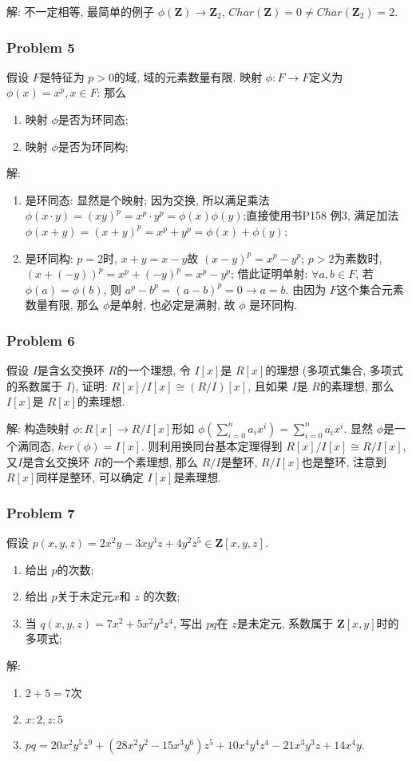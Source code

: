 \documentclass[a4paper,12pt]{ctexart}
\newcommand{\Z}{\mathbf{Z}}
\begin{document}
    解: 不一定相等, 最简单的例子 $ \phi(\Z)\rightarrow\Z_2 $, $ Char(\Z)=0\neq Char(\Z_2)=2 $.
    \subsubsection*{Problem 5}
    假设 $ F $是特征为 $ p>0 $的域, 域的元素数量有限. 映射 $ \phi:F\rightarrow F $定义为 $ \phi(x)=x^p,x\in F $:
    那么\begin{enumerate}
      \item 映射 $ \phi $是否为环同态;
      \item 映射 $ \phi $是否为环同构;
    \end{enumerate} 

    解:\begin{enumerate}
      \item 是环同态: 显然是个映射; 因为交换, 所以满足乘法 $ \phi(x\cdot y)=(xy)^p=x^p\cdot y^p=\phi(x)\phi(y) $;直接使用书P158 例3, 满足加法 $ \phi(x+y)=(x+y)^p=x^p+y^p=\phi(x)+\phi(y) $;
      \item 是环同构: $ p=2 $时, $ x+y=x-y $故 $ (x-y)^p=x^p-y^p $; $ p>2 $为素数时, $ (x+(-y))^p=x^p+(-y)^p=x^p-y^p $; 借此证明单射: $ \forall a,b\in F $, 若
      $ \phi(a)=\phi(b) $, 则 $ a^p-b^p=(a-b)^p=0\rightarrow a=b $. 由因为 $ F $这个集合元素数量有限, 那么 $ \phi $是单射, 也必定是满射, 故 $ \phi $ 是环同构.
    \end{enumerate}
\subsubsection*{Problem 6}
    假设 $ I $是含幺交换环 $ R $的一个理想, 令 $ I[x] $是 $ R[x] $的理想 (多项式集合, 多项式的系数属于 $ I $), 证明: $ R[x]/I[x]\cong (R/I)[x] $, 且如果
    $ I $是 $ R $的素理想, 那么 $ I[x] $是 $ R[x] $的素理想. 

    解: 构造映射 $ \phi:R[x]\rightarrow R/I[x] $形如 $ \phi(\sum_{i=0}^{n}a_ix^i)=\sum_{i=0}^{n}\overline{a_i}x^i $. 显然 $ \phi $是一个满同态, $ ker(\phi)=I[x] $.
    则利用换同台基本定理得到 $ R[x]/I[x]\cong R/I[x] $, 又$ I $是含幺交换环 $ R $的一个素理想, 那么 $ R/I $是整环, $ R/I[x] $也是整环, 注意到 $ R[x] $同样是整环, 可以确定 
    $ I[x] $是素理想.
\subsubsection*{Problem 7}
    假设 $ p(x,y,z)=2x^2y-3xy^3z+4y^2z^5\in\Z[x,y,z] $.
    \begin{enumerate}
      \item 给出 $ p $的次数;
      \item 给出 $ p $关于未定元$ x $和 $ z $ 的次数;
      \item 当 $ q(x,y,z)=7x^2+5x^2y^3z^4 $, 写出 $ pq $在 $ z $是未定元, 系数属于 $ \Z[x,y] $时的多项式;
    \end{enumerate}

    解:\begin{enumerate}
      \item $ 2+5=7 $次
      \item $ x:2,z:5 $
      \item $ pq=20x^2y^5z^9+(28x^2y^2-15x^3y^6)z^5+10x^4y^4z^4-21x^3y^3z+14x^4y $.
    \end{enumerate}
\end{document}
